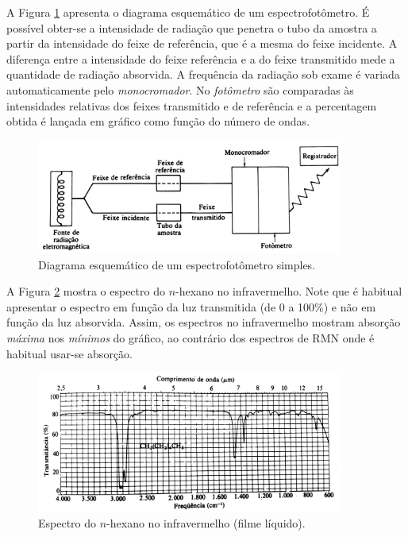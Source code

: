 A Figura \ref{figura_9_1} apresenta o diagrama esquemático de um espectrofotômetro. É possível obter-se a intensidade de radiação que penetra o tubo da amostra a partir da intensidade do feixe de referência, que é a mesma do feixe incidente. A diferença entre a intensidade do feixe referência e a do feixe transmitido mede a quantidade de radiação absorvida. A frequência da radiação sob exame é variada automaticamente pelo \textit{monocromador}. No \textit{fotômetro} são comparadas às intensidades relativas dos feixes transmitido e de referência e a percentagem obtida é lançada em gráfico como função do número de ondas.

\begin{figure}[H]
    \centering
    \includegraphics[width=0.9\textwidth,angle=0]{content/images/Figura_9_1.pdf}
    \caption{Diagrama esquemático de um espectrofotômetro simples.}
    \label{figura_9_1}
\end{figure}

A Figura \ref{figura_9_2} mostra o espectro do $n$-hexano no infravermelho. Note que é habitual apresentar o espectro em função da luz transmitida (de 0 a 100\%) e não em função da luz absorvida. Assim, os espectros no infravermelho mostram absorção \textit{máxima} nos \textit{mínimos} do gráfico, ao contrário dos espectros de RMN onde é habitual usar-se absorção.

\begin{figure}[H]
    \centering
    \includegraphics[width=0.9\textwidth,angle=0]{content/images/Figura_9_2.pdf}
    \caption{Espectro do $n$-hexano no infravermelho (filme líquido).}
    \label{figura_9_2}
\end{figure}

